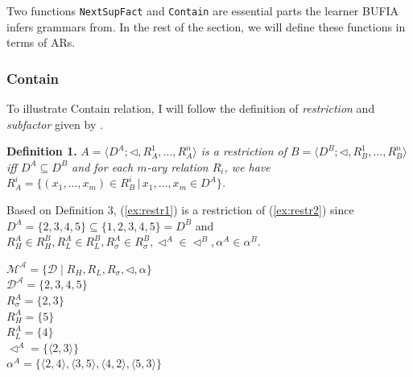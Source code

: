 \documentclass[11pt,letterpaper]{article}
\begin{document}
Two functions \verb*|NextSupFact| and \verb*|Contain| are essential parts the learner BUFIA infers grammars from. In the rest of the section, we will define these functions in terms of ARs.

\subsubsection{Contain} 
To illustrate Contain relation, I will follow the definition of \textit{restriction} and \textit{subfactor} given by \citet[p.94]{chandleeLearningPartiallyOrdered2019}.

\textbf{Definition 1.}\textit{ $A = \langle D^A; \lhd, R_A^1, \ldots, R_A^n \rangle$ is a restriction of $B = \langle D^B; \lhd, R_B^1, \ldots, R_B^n \rangle$ iff $D^A \subseteq D^B$ and for each $m$-ary relation $R_i$, we have $R_A^i = \{(x_1, \ldots, x_m) \in R_B^i \,|\, x_1, \ldots, x_m \in D^A\}$. }

Based on Definition 3, (\ref{ex:restr1}) is a restriction of (\ref{ex:restr2}) since $D^A = \{2,3,4,5\} \subseteq \{1,2,3,4,5\} = D^B$ and $R^A_H \in R^B_H, R^A_L \in R^B_L, R^A_\sigma \in R^B_\sigma, \lhd^A \in \lhd^B, \alpha^A \in \alpha^B$.

\begin{multicols}{2}
\ea \label{ex:restr1}

\begin{minipage}{\linewidth}
	$\mathcal{M^A} = \{\mathcal{D} \mid R_H, R_L, R_\sigma, \lhd, \alpha \}$\\
	$\mathcal{D^A} = \{2, 3, 4, 5\}$\\
	$R^A_\sigma = \{2, 3\}$ \\
	$R^A_H = \{5\}$ \\
	$R^A_L = \{4\}$ \\
	$\lhd^A = \{\langle 2, 3\rangle \}$ \\
	$\alpha^A = \{\langle 2,4\rangle,  \langle 3, 5\rangle, \langle 4,2\rangle,  \langle 5,3\rangle \}$ 
\end{minipage}
\z
\end{multicols}
\end{document}
